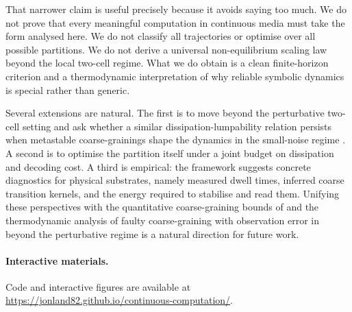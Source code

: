 \documentclass[11pt,a4paper]{article}
\theoremstyle{definition}
\theoremstyle{remark}
\begin{document}
That narrower claim is useful precisely because it avoids saying too much. We do not prove that every meaningful computation in continuous media must take the form analysed here. We do not classify all trajectories or optimise over all possible partitions. We do not derive a universal non-equilibrium scaling law beyond the local two-cell regime. What we do obtain is a clean finite-horizon criterion and a thermodynamic interpretation of why reliable symbolic dynamics is special rather than generic.

Several extensions are natural. The first is to move beyond the perturbative two-cell setting and ask whether a similar dissipation-lumpability relation persists when metastable coarse-grainings shape the dynamics in the small-noise regime \citep{freidlin1984}. A second is to optimise the partition itself under a joint budget on dissipation and decoding cost. A third is empirical: the framework suggests concrete diagnostics for physical substrates, namely measured dwell times, inferred coarse transition kernels, and the energy required to stabilise and read them. Unifying these perspectives with the quantitative coarse-graining bounds of \citep{hilder2024,andrieux2012} and the thermodynamic analysis of faulty coarse-graining with observation error in \citep{vandermeer2025} beyond the perturbative regime is a natural direction for future work.

\paragraph{Interactive materials.}
Code and interactive figures are available at \url{https://jonland82.github.io/continuous-computation/}.
\end{document}

